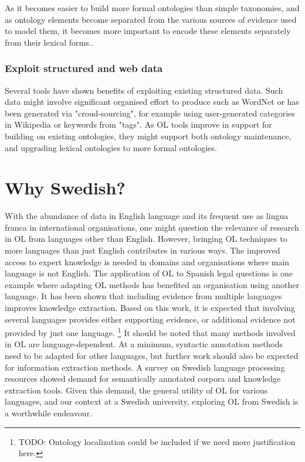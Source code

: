 \documentclass[a4paper]{report}
\newcommand{\todo}[1]{\footnote{{\color{red} TODO: #1}}}
\begin{document}
As it becomes easier to build more formal ontologies than simple taxonomies, and as ontology elements become separated from the various sources of evidence used to model them, it becomes more important to encode these elements separately from their lexical forms.\cite{Wong11Survey}.

\subsubsection{Exploit structured and web data}

Several tools have shown benefits of exploiting existing structured data.
Such data might involve significant organised effort to produce such as WordNet\cite{Fellbaum98WordNet} or has been generated via "croud-sourcing", for example using user-generated categories in Wikipedia or keywords from "tags"\cite{Wong11Survey}.
As OL tools improve in support for building on existing ontologies, they might support both ontology maintenance, and upgrading lexical ontologies to more formal ontologies\cite{Wong11Survey}.

\section{Why Swedish?}
\label{sec:background:swedish}

With the abundance of data in English language and its frequent use as lingua franca in international organisations, one might question the relevance of research in OL from languages other than English.
However, bringing OL techniques to more languages than just English contributes in various ways.
The improved access to expert knowledge is needed in domains and organisations where main language is not English.
The application of OL to Spanish legal questions is one example where adapting OL methods has benefited an organisation using another language\cite{Voelkner2008Spanish}.
It has been shown that including evidence from multiple languages improves knowledge extraction\cite{Hjelm09Thesis}.
Based on this work, it is expected that involving several languages provides either supporting evidence, or additional evidence not provided by just one language\cite{Hjelm09Thesis}.
\todo{Ontology localization could be included if we need more justification here.}
It should be noted that many methods involved in OL are language-dependent.
At a minimum, syntactic annotation methods need to be adapted for other languages, but further work should also be expected for information extraction methods.
A survey on Swedish language processing resources showed demand for semantically annotated corpora and knowledge extraction tools\cite{EleniusEtAl08SwedTools}.
Given this demand, the general utility of OL for various languages, and our context at a Swedish university, exploring OL from Swedish is a worthwhile endeavour.
\end{document}
